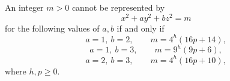 \begin{proposition}
An integer $m>0$ cannot be represented by
\[
    x^2+ay^2+bz^2=m
\]
for the following values of $a,b$ if and only if
\[
    a=1,\ b=2,\qquad m=4^h(16p+14),
\]
\[
    a=1,\ b=3,\qquad m=9^h(9p+6),
\]
\[
    a=2,\ b=3,\qquad m=4^h(16p+10),
\]
where $h,p\ge0$.
\end{proposition}
